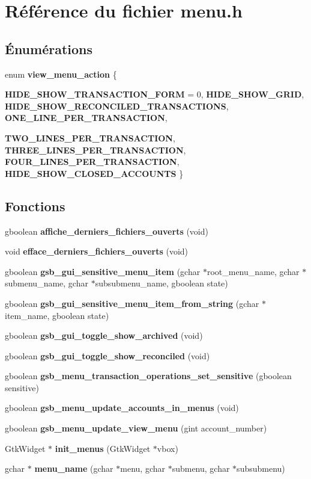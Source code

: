 \section{Référence du fichier menu.h}
\label{menu_8h}
\subsection*{Énumérations}
\begin{DoxyCompactItemize}
\item 
enum {\bf view\_\-menu\_\-action} \{ \par
{\bf HIDE\_\-SHOW\_\-TRANSACTION\_\-FORM} =  0, 
{\bf HIDE\_\-SHOW\_\-GRID}, 
{\bf HIDE\_\-SHOW\_\-RECONCILED\_\-TRANSACTIONS}, 
{\bf ONE\_\-LINE\_\-PER\_\-TRANSACTION}, 
\par
{\bf TWO\_\-LINES\_\-PER\_\-TRANSACTION}, 
{\bf THREE\_\-LINES\_\-PER\_\-TRANSACTION}, 
{\bf FOUR\_\-LINES\_\-PER\_\-TRANSACTION}, 
{\bf HIDE\_\-SHOW\_\-CLOSED\_\-ACCOUNTS}
 \}
\end{DoxyCompactItemize}
\subsection*{Fonctions}
\begin{DoxyCompactItemize}
\item 
gboolean {\bf affiche\_\-derniers\_\-fichiers\_\-ouverts} (void)
\item 
void {\bf efface\_\-derniers\_\-fichiers\_\-ouverts} (void)
\item 
gboolean {\bf gsb\_\-gui\_\-sensitive\_\-menu\_\-item} (gchar $\ast$root\_\-menu\_\-name, gchar $\ast$submenu\_\-name, gchar $\ast$subsubmenu\_\-name, gboolean state)
\item 
gboolean {\bf gsb\_\-gui\_\-sensitive\_\-menu\_\-item\_\-from\_\-string} (gchar $\ast$item\_\-name, gboolean state)
\item 
gboolean {\bf gsb\_\-gui\_\-toggle\_\-show\_\-archived} (void)
\item 
gboolean {\bf gsb\_\-gui\_\-toggle\_\-show\_\-reconciled} (void)
\item 
gboolean {\bf gsb\_\-menu\_\-transaction\_\-operations\_\-set\_\-sensitive} (gboolean sensitive)
\item 
gboolean {\bf gsb\_\-menu\_\-update\_\-accounts\_\-in\_\-menus} (void)
\item 
gboolean {\bf gsb\_\-menu\_\-update\_\-view\_\-menu} (gint account\_\-number)
\item 
GtkWidget $\ast$ {\bf init\_\-menus} (GtkWidget $\ast$vbox)
\item 
gchar $\ast$ {\bf menu\_\-name} (gchar $\ast$menu, gchar $\ast$submenu, gchar $\ast$subsubmenu)
\end{DoxyCompactItemize}


